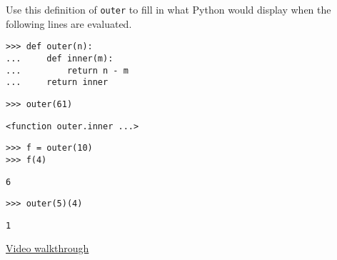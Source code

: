 \begin{blocksection}
\question Use this definition of \lstinline$outer$ to fill in what Python would
display when the following lines are evaluated.

\begin{lstlisting}
>>> def outer(n):
...     def inner(m):
...         return n - m
...     return inner
\end{lstlisting}
\begin{lstlisting}
>>> outer(61)
\end{lstlisting}
\begin{solution}[.2in]
\begin{lstlisting}
<function outer.inner ...>
\end{lstlisting}
\end{solution}

\begin{lstlisting}
>>> f = outer(10)
>>> f(4)
\end{lstlisting}
\begin{solution}[.2in]
\begin{lstlisting}
6
\end{lstlisting}
\end{solution}

\begin{lstlisting}
>>> outer(5)(4)
\end{lstlisting}
\begin{solution}[.2in]
\begin{lstlisting}
1
\end{lstlisting}
\href{https://www.youtube.com/watch?v=Fiw0f5yuQgo&vq=hd1080&t=75m34s}{Video walkthrough}
\end{solution}
\end{blocksection}
